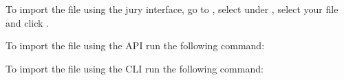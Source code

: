\documentclass[a4paper,10pt,english,openany]{sphinxmanual}
\begin{document}
\sphinxAtStartPar
To import the file using the jury interface, go to , select
 under , select your file and click .

\sphinxAtStartPar
To import the file using the API run the following command:

\begin{sphinxVerbatim}[commandchars=\\\{\}]
      
\end{sphinxVerbatim}

\sphinxAtStartPar
To import the file using the CLI run the following command:

\begin{sphinxVerbatim}[commandchars=\\\{\}]
      
\end{sphinxVerbatim}
\end{document}
